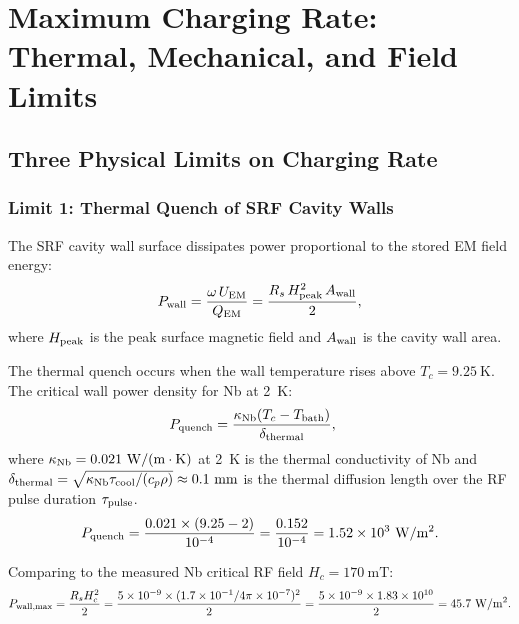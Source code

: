 \documentclass[aps,prd,twocolumn,superscriptaddress]{revtex4-2}
\begin{document}
\section{Maximum Charging Rate: Thermal, Mechanical, and Field Limits}
\label{sec:charging}

\subsection{Three Physical Limits on Charging Rate}

\subsubsection{Limit 1: Thermal Quench of SRF Cavity Walls}

The SRF cavity wall surface dissipates power proportional to the stored
EM field energy:
\begin{equation}
P_{\rm wall} = \frac{\omega\,U_{\rm EM}}{Q_{\rm EM}}
= \frac{R_s\,H_{\rm peak}^2\,A_{\rm wall}}{2},
\end{equation}
where $H_{\rm peak}$ is the peak surface magnetic field and
$A_{\rm wall}$ is the cavity wall area.

The thermal quench occurs when the wall temperature rises above
$T_c = 9.25~\mathrm{K}$.  The critical wall power density for
Nb at 2~K:
\begin{align}
P_{\rm quench} &= \frac{\kappa_{\rm Nb}(T_c - T_{\rm bath})}{\delta_{\rm thermal}},
\end{align}
where $\kappa_{\rm Nb} = 0.021~\mathrm{W/(m\cdot K)}$ at 2~K is the
thermal conductivity of Nb and $\delta_{\rm thermal} = \sqrt{\kappa_{\rm Nb}
\tau_{\rm cool}/(c_p\rho)} \approx 0.1~\mathrm{mm}$ is the thermal
diffusion length over the RF pulse duration $\tau_{\rm pulse}$.
\begin{equation}
P_{\rm quench} = \frac{0.021\times(9.25 - 2)}{10^{-4}}
= \frac{0.152}{10^{-4}} = 1.52\times 10^3~\mathrm{W/m^2}.
\end{equation}

Comparing to the measured Nb critical RF field $H_c = 170~\mathrm{mT}$:
\begin{equation}
P_{\rm wall,max} = \frac{R_s H_c^2}{2}
= \frac{5\times 10^{-9}\times(1.7\times 10^{-1}/4\pi\times 10^{-7})^2}{2}
= \frac{5\times 10^{-9}\times 1.83\times 10^{10}}{2}
= 45.7~\mathrm{W/m^2}.
\end{equation}
\end{document}
